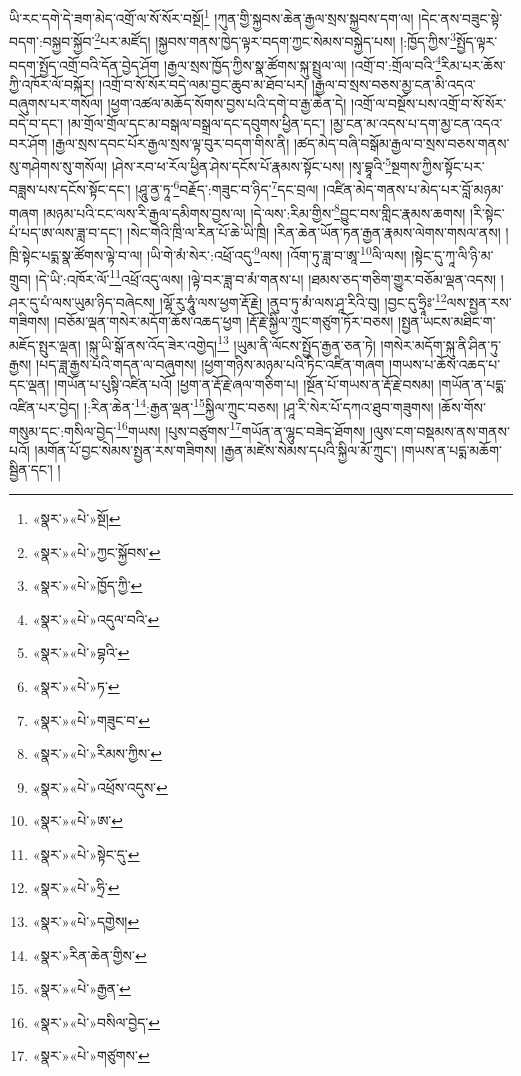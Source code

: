ཡི་རང་དགེ་དེ་ཟག་མེད་འགྲོ་ལ་སོ་སོར་བསྔོ།\footnote{«སྣར་»«པེ་»སྔོ།} །ཀུན་གྱི་སྐྱབས་ཆེན་རྒྱལ་སྲས་སྐྱབས་དག་ལ། །དེང་ནས་བཟུང་སྟེ་བདག་:བསྐྱབ་སྐྱོབ་\footnote{«སྣར་»«པེ་»ཀྱང་སྐྱོབས་}པར་མཛོད། །སྐྱབས་གནས་ཁྱེད་ལྟར་བདག་ཀྱང་སེམས་བསྐྱེད་པས། །:ཁྱོད་ཀྱིས་\footnote{«སྣར་»«པེ་»ཁྱོད་ཀྱི་}སྤྱོད་ལྟར་བདག་སྤྱོད་འགྲོ་བའི་དོན་བྱེད་ཤོག །རྒྱལ་སྲས་ཁྱོད་ཀྱིས་སྣ་ཚོགས་སྐུ་སྤྲུལ་ལ། །འགྲོ་བ་:གྲོལ་བའི་\footnote{«སྣར་»«པེ་»འདུལ་བའི་}རིམ་པར་ཆོས་ཀྱི་འཁོར་ལོ་བསྐོར། །འགྲོ་བ་སོ་སོར་བདེ་ལམ་བྱང་ཆུབ་མ་ཐོབ་པར། །རྒྱལ་བ་སྲས་བཅས་མྱ་ངན་མི་འདའ་བཞུགས་པར་གསོལ། །ཕྱག་འཚལ་མཆོད་སོགས་བྱས་པའི་དགེ་བ་རྒྱ་ཆེན་དེ། །འགྲོ་ལ་བསྔོས་པས་འགྲོ་བ་སོ་སོར་བདེ་བ་དང་། །མ་གྲོལ་གྲོལ་དང་མ་བསྒལ་བསྒྲལ་དང་དབུགས་ཕྱིན་དང་། །མྱ་ངན་མ་འདས་པ་དག་མྱ་ངན་འདའ་བར་ཤོག །རྒྱལ་སྲས་དབང་པོར་རྒྱལ་སྲས་ལྟ་བུར་བདག་གིས་ནི། །ཚད་མེད་བཞི་བསྒོམ་རྒྱལ་བ་སྲས་བཅས་གནས་སུ་གཤེགས་སུ་གསོལ། །ཤེས་རབ་ཕ་རོལ་ཕྱིན་ཤེས་དངོས་པོ་རྣམས་སྟོང་པས། །སྭ་བྷཱའི་\footnote{«སྣར་»«པེ་»བྷའི་}སྔགས་ཀྱིས་སྟོང་པར་བཟླས་པས་དངོས་སྟོང་དང་། །ཤཱུ་ནྱ་ཏཱ་\footnote{«སྣར་»«པེ་»ཏ་}བརྗོད་:གཟུང་བ་ཉིད་\footnote{«སྣར་»«པེ་»གཟུང་བ་}དང་བྲལ། །འཛིན་མེད་གནས་པ་མེད་པར་བློ་མཉམ་གཞག །མཉམ་པའི་ངང་ལས་རི་རྒྱལ་དམིགས་བྱས་ལ། །དེ་ལས་:རིམ་གྱིས་\footnote{«སྣར་»«པེ་»རིམས་ཀྱིས་}བྱུང་བས་གླིང་རྣམས་ཆགས། །རི་སྟེང་པཾ་པད་ཨ་ལས་ཟླ་བ་དང་། །སེང་གེའི་ཁྲི་ལ་རིན་པོ་ཆེ་ཡི་ཁྲི། །རིན་ཆེན་ཡོན་ཏན་རྒྱན་རྣམས་ལེགས་གསལ་ནས། །ཁྲི་སྟེང་པདྨ་སྣ་ཚོགས་ལྟེ་བ་ལ། །ཡི་གེ་མཾ་སེར་:འཕྲོ་འདུ་\footnote{«སྣར་»«པེ་»འཕྲོས་འདུས་}ལས། །འོག་ཏུ་ཟླ་བ་ཨཱ་\footnote{«སྣར་»«པེ་»ཨ་}ལི་ལས། །སྟེང་དུ་ཀཱ་ལི་ཉི་མ་གྲུབ། །དེ་ཡི་:འཁོར་ལོ་\footnote{«སྣར་»«པེ་»སྟེང་དུ་}འཕྲོ་འདུ་ལས། །ལྟེ་བར་ཟླ་བ་མཾ་གནས་པ། །ཐམས་ཅད་གཅིག་གྱུར་བཅོམ་ལྡན་འདས། །ཤར་དུ་པཾ་ལས་ཡུམ་ཉིད་བཞེངས། །ལྷོ་རུ་ཧཱུཾ་ལས་ཕྱག་རྡོ་རྗེ། །ནུབ་ཏུ་མཾ་ལས་ཤཱ་རིའི་བུ། །བྱང་དུ་ཧྲཱིཿ་\footnote{«སྣར་»«པེ་»ཧྲི་}ལས་སྤྱན་རས་གཟིགས། །བཅོམ་ལྡན་གསེར་མདོག་ཆོས་འཆད་ཕྱག །རྡོ་རྗེ་སྐྱིལ་ཀྲུང་གཙུག་ཏོར་བཅས། །སྤྱན་ཡངས་མཐིང་ག་མཇོད་སྤུར་ལྡན། །སྐུ་ཡི་སྒོ་ནས་འོད་ཟེར་འགྱེད།\footnote{«སྣར་»«པེ་»དགྱེས།} །ཡུམ་ནི་ལོངས་སྤྱོད་རྒྱན་ཅན་ཏེ། །གསེར་མདོག་སྐུ་ནི་ཤིན་ཏུ་རྒྱས། །པད་ཟླ་རྒྱས་པའི་གདན་ལ་བཞུགས། །ཕྱག་གཉིས་མཉམ་པའི་ཏིང་འཛིན་གཞག །གཡས་པ་ཆོས་འཆད་པ་དང་ལྡན། །གཡོན་པ་པུསྟི་འཛིན་པའོ། །ཕྱག་ན་རྡོ་རྗེ་ཞལ་གཅིག་པ། །སྔོན་པོ་གཡས་ན་རྡོ་རྗེ་བསམ། །གཡོན་ན་པདྨ་འཛིན་པར་བྱེད། །:རིན་ཆེན་\footnote{«སྣར་»རིན་ཆེན་གྱིས་}:རྒྱན་ལྡན་\footnote{«སྣར་»«པེ་»རྒྱན་}སྐྱིལ་ཀྲུང་བཅས། །ཤཱ་རི་སེར་པོ་དཀའ་ཐུབ་གཟུགས། །ཆོས་གོས་གསུམ་དང་:གསིལ་བྱེད་\footnote{«སྣར་»«པེ་»བསིལ་བྱེད་}གཡས། །པུས་བཙུགས་\footnote{«སྣར་»«པེ་»གཙུགས་}གཡོན་ན་ལྷུང་བཟེད་ཐོགས། །ལུས་ངག་བསྡམས་ནས་གནས་པའོ། །མགོན་པོ་བྱང་སེམས་སྤྱན་རས་གཟིགས། །རྒྱན་མཛེས་སེམས་དཔའི་སྐྱིལ་མོ་ཀྲུང་། །གཡས་ན་པདྨ་མཆོག་སྦྱིན་དང་། །
